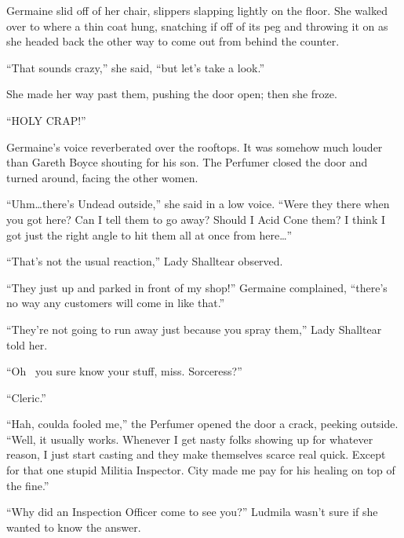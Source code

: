 Germaine slid off of her chair, slippers slapping lightly on the floor. She walked over to where a thin coat hung, snatching if off of its peg and throwing it on as she headed back the other way to come out from behind the counter.

 

“That sounds crazy,” she said, “but let’s take a look.”

 

She made her way past them, pushing the door open; then she froze.

 

“HOLY CRAP!”

 

Germaine’s voice reverberated over the rooftops. It was somehow much louder than Gareth Boyce shouting for his son. The Perfumer closed the door and turned around, facing the other women.

 

“Uhm…there’s Undead outside,” she said in a low voice. “Were they there when you got here? Can I tell them to go away? Should I Acid Cone them? I think I got just the right angle to hit them all at once from here…”

 

“That’s not the usual reaction,” Lady Shalltear observed.

 

“They just up and parked in front of my shop!” Germaine complained, “there’s no way any customers will come in like that.”

 

“They’re not going to run away just because you spray them,” Lady Shalltear told her.

 

“Oh~ you sure know your stuff, miss. Sorceress?”

 

“Cleric.”

 

“Hah, coulda fooled me,” the Perfumer opened the door a crack, peeking outside. “Well, it usually works. Whenever I get nasty folks showing up for whatever reason, I just start casting and they make themselves scarce real quick. Except for that one stupid Militia Inspector. City made me pay for his healing on top of the fine.”

 

“Why did an Inspection Officer come to see you?” Ludmila wasn’t sure if she wanted to know the answer.

 

